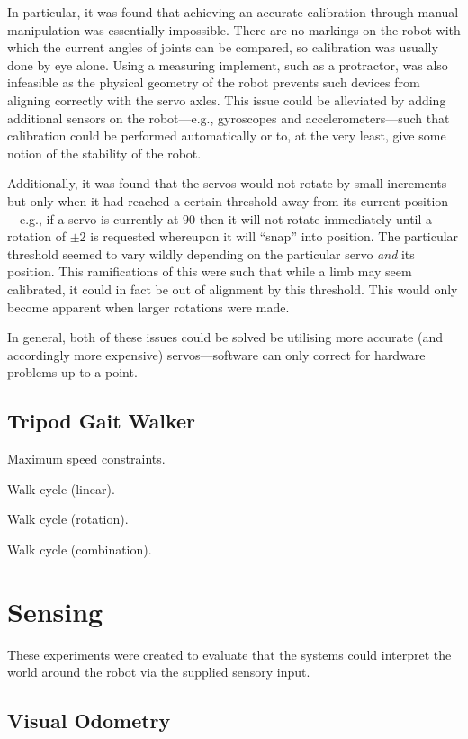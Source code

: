 In particular, it was found that achieving an accurate calibration through manual manipulation was essentially impossible. There are no markings on the robot with which the current angles of joints can be compared, so calibration was usually done by eye alone. Using a measuring implement, such as a protractor, was also infeasible as the physical geometry of the robot prevents such devices from aligning correctly with the servo axles. This issue could be alleviated by adding additional sensors on the robot---e.g., gyroscopes and accelerometers---such that calibration could be performed automatically or to, at the very least, give some notion of the stability of the robot.

Additionally, it was found that the servos would not rotate by small increments but only when it had reached a certain threshold away from its current position---e.g., if a servo is currently at $90$\textdegree{} then it will not rotate immediately until a rotation of $\pm2$\textdegree{} is requested whereupon it will ``snap'' into position. The particular threshold seemed to vary wildly depending on the particular servo \emph{and} its position. This ramifications of this were such that while a limb may seem calibrated, it could in fact be out of alignment by this threshold. This would only become apparent when larger rotations were made.

In general, both of these issues could be solved be utilising more accurate (and accordingly more expensive) servos---software can only correct for hardware problems up to a point.

\subsection{Tripod Gait Walker}

Maximum speed constraints.

Walk cycle (linear).

Walk cycle (rotation).

Walk cycle (combination). 

\section{Sensing}

These experiments were created to evaluate that the systems could interpret the world around the robot via the supplied sensory input.

\subsection{Visual Odometry}

